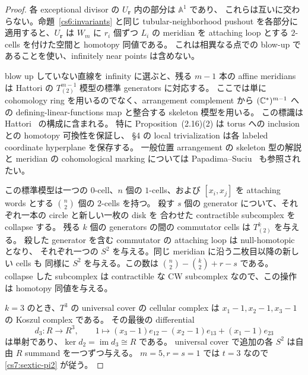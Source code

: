 \begin{proof}
各 exceptional divisor の $U_{\boldsymbol r}$ 内の部分は $\mathbb A^1$ であり、
これらは互いに交わらない。命題~\ref{cs6:invariants} と同じ tubular-neighborhood
pushout を各部分に適用すると、$U_{\boldsymbol r}$ は $W_m$ に $r_i$ 個ずつ
$L_i$ の meridian を attaching loop とする $2$-cells を付けた空間と homotopy 同値である。
これは相異なる点での blow-up であることを使い、infinitely near points は含めない。

blow up していない直線を infinity に選ぶと、残る $m-1$ 本の affine meridians は
Hattori の $T^{m-1}_{(2)}$ 模型の標準 generators に対応する。
ここでは単に cohomology ring を用いるのでなく、arrangement complement から
$(\mathbb C^*)^{m-1}$ への defining-linear-functions map と整合する skeleton 模型を用いる。
この標識は Hattori~\cite[\S2, equation~(2.5), Proposition~(2.16)(2), pp.~207--213;
\S4, Lemma~(4.2), pp.~217--219]{Hattori} の構成に含まれる。
特に Proposition~(2.16)(2) は torus への inclusion との homotopy 可換性を保証し、
\S4 の local trivialization は各 labeled coordinate hyperplane を保存する。
一般位置 arrangement の skeleton 型の解説と meridian の cohomological marking については
Papadima--Suciu~\cite[\S\S1.1, 4.3; proof of Theorem~4.8(4)]{PapadimaSuciu}
も参照されたい。

この標準模型は一つの $0$-cell、$n$ 個の $1$-cells、および
$[x_i,x_j]$ を attaching words とする $\binom n2$ 個の $2$-cells を持つ。
殺す $s$ 個の generator について、それぞれ一本の circle と新しい一枚の disk を
合わせた contractible subcomplex を collapse する。
残る $k$ 個の generators の間の commutator cells は $T^k_{(2)}$ を与える。
殺した generator を含む commutator の attaching loop は null-homotopic となり、
それぞれ一つの $S^2$ を与える。同じ meridian に沿う二枚目以降の新しい cells も
同様に $S^2$ を与える。この数は $\binom n2-\binom k2+r-s$ である。
collapse した subcomplex は contractible な CW subcomplex なので、この操作は
homotopy 同値を与える。

$k=3$ のとき、$T^3$ の universal cover の cellular complex は
$x_1-1,x_2-1,x_3-1$ の Koszul complex である。
その最後の differential
\[
 d_3:R\longrightarrow R^3,\qquad
 1\longmapsto (x_3-1)e_{12}-(x_2-1)e_{13}+(x_1-1)e_{23}
\]
は単射であり、$\ker d_2=\operatorname{im}d_3\cong R$ である。
universal cover で追加の各 $S^2$ は自由 $R$ summand を一つずつ与える。
$m=5,r=s=1$ では $t=3$ なので \eqref{cs7:sextic-pi2} が従う。
\end{proof}

